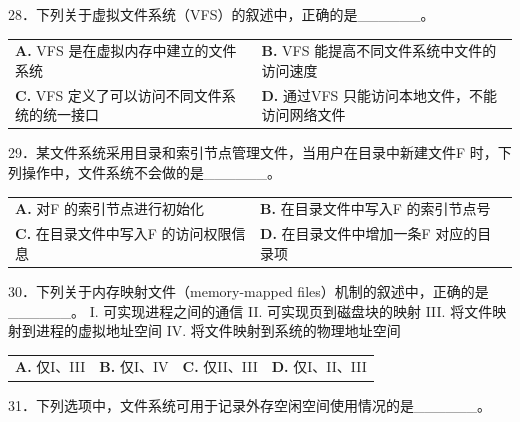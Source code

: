 \documentclass[UTF8,11pt]{ctexart}
\begin{document}
28．下列关于虚拟文件系统（VFS）的叙述中，正确的是\_\_\_\_\_\_。


\begin{center}\begin{tabular}{>{\raggedright\arraybackslash}p{\dimexpr(\linewidth-4\tabcolsep)/2\relax}>{\raggedright\arraybackslash}p{\dimexpr(\linewidth-4\tabcolsep)/2\relax}}
\textbf{A.} VFS 是在虚拟内存中建立的文件系统 & \textbf{B.} VFS 能提高不同文件系统中文件的访问速度\\[.35em]
\textbf{C.} VFS 定义了可以访问不同文件系统的统一接口 & \textbf{D.} 通过VFS 只能访问本地文件，不能访问网络文件\\[.35em]\end{tabular}\end{center}

29．某文件系统采用目录和索引节点管理文件，当用户在目录中新建文件F 时，下列操作中，文件系统不会做的是\_\_\_\_\_\_。


\begin{center}\begin{tabular}{>{\raggedright\arraybackslash}p{\dimexpr(\linewidth-4\tabcolsep)/2\relax}>{\raggedright\arraybackslash}p{\dimexpr(\linewidth-4\tabcolsep)/2\relax}}
\textbf{A.} 对F 的索引节点进行初始化 & \textbf{B.} 在目录文件中写入F 的索引节点号\\[.35em]
\textbf{C.} 在目录文件中写入F 的访问权限信息 & \textbf{D.} 在目录文件中增加一条F 对应的目录项\\[.35em]\end{tabular}\end{center}

30．下列关于内存映射文件（memory-mapped files）机制的叙述中，正确的是\_\_\_\_\_\_。 I. 可实现进程之间的通信 II. 可实现页到磁盘块的映射 III. 将文件映射到进程的虚拟地址空间 IV. 将文件映射到系统的物理地址空间


\begin{center}\begin{tabular}{>{\raggedright\arraybackslash}p{\dimexpr(\linewidth-8\tabcolsep)/4\relax}>{\raggedright\arraybackslash}p{\dimexpr(\linewidth-8\tabcolsep)/4\relax}>{\raggedright\arraybackslash}p{\dimexpr(\linewidth-8\tabcolsep)/4\relax}>{\raggedright\arraybackslash}p{\dimexpr(\linewidth-8\tabcolsep)/4\relax}}
\textbf{A.} 仅I、III & \textbf{B.} 仅I、IV & \textbf{C.} 仅II、III & \textbf{D.} 仅I、II、III\\[.35em]\end{tabular}\end{center}

31．下列选项中，文件系统可用于记录外存空闲空间使用情况的是\_\_\_\_\_\_。
\end{document}
